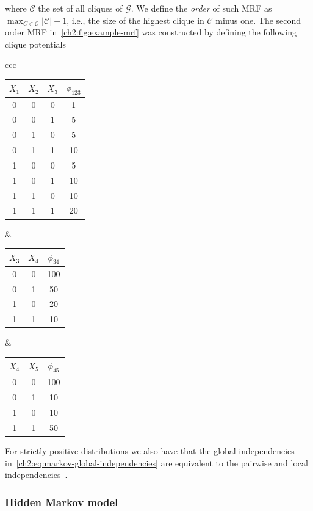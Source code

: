 where $\mathcal{C}$ the set of all cliques of $\mathcal{G}$. We define the \emph{order} of such MRF as $\max_{C \in \mathcal{C}} |\mathcal{C}|-1$, i.e., the size of the highest clique in $\mathcal{C}$ minus one. The second order MRF in~\cref{ch2:fig:example-mrf} was constructed by defining the following clique potentials

\begin{center}
\begin{tabular}{ccc}
\begin{tabular}{|c|c|c|c|}
\hline
$X_1$ & $X_2$ & $X_3$ & $\phi_{123}$\\
\hline
0 & 0 & 0 & 1\\
0 & 0 & 1 & 5\\
0 & 1 & 0 & 5\\
0 & 1 & 1 & 10\\
1 & 0 & 0 & 5\\
1 & 0 & 1 & 10\\
1 & 1 & 0 & 10\\
1 & 1 & 1 & 20\\
\hline
\end{tabular}&
\begin{tabular}{|c|c|c|}
\hline
$X_3$ & $X_4$ & $\phi_{34}$\\
\hline
0 & 0 & 100\\
0 & 1 & 50\\
1 & 0 & 20\\
1 & 1 & 10\\
\hline
\end{tabular}&
\begin{tabular}{|c|c|c|}
\hline
$X_4$ & $X_5$ & $\phi_{45}$\\
\hline
0 & 0 & 100\\
0 & 1 & 10\\
1 & 0 & 10\\
1 & 1 & 50\\
\hline
\end{tabular}
\end{tabular}
\end{center}

For strictly positive distributions we also have that the global independencies in~\cref{ch2:eq:markov-global-independencies} are equivalent to the pairwise and local independencies~\cite{koller09}.

\subsubsection{Hidden Markov model}

